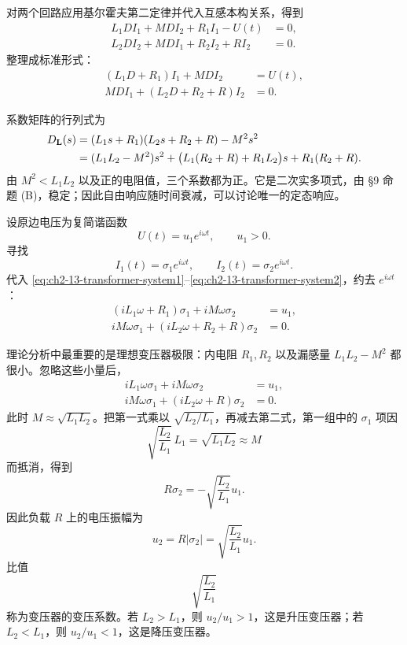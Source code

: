 对两个回路应用基尔霍夫第二定律并代入互感本构关系，得到
\begin{align}
 L_1DI_1+MDI_2+R_1I_1-U(t)&=0,
 \label{eq:ch2-13-transformer-loop1}\\
 L_2DI_2+MDI_1+R_2I_2+RI_2&=0.
 \label{eq:ch2-13-transformer-loop2}
\end{align}
整理成标准形式：
\begin{align}
 (L_1D+R_1)I_1+MDI_2&=U(t),
 \label{eq:ch2-13-transformer-system1}\\
 MDI_1+(L_2D+R_2+R)I_2&=0.
 \label{eq:ch2-13-transformer-system2}
\end{align}

系数矩阵的行列式为
\begin{align}
 D_{\mathbf{L}}(s)
 &=(L_1s+R_1)(L_2s+R_2+R)-M^2s^2\notag\\
 &=(L_1L_2-M^2)s^2
   +\bigl(L_1(R_2+R)+R_1L_2\bigr)s
   +R_1(R_2+R).
 \label{eq:ch2-13-transformer-determinant}
\end{align}
由 \(M^2<L_1L_2\) 以及正的电阻值，三个系数都为正。它是二次实多项式，由 §9 命题 (B)，稳定；因此自由响应随时间衰减，可以讨论唯一的定态响应。

设原边电压为复简谐函数
\begin{equation}
 U(t)=u_1e^{i\omega t},
 \qquad u_1>0.
 \label{eq:ch2-13-transformer-harmonic-source}
\end{equation}
寻找
\begin{equation}
 I_1(t)=\sigma_1e^{i\omega t},
 \qquad
 I_2(t)=\sigma_2e^{i\omega t}.
 \label{eq:ch2-13-transformer-complex-currents}
\end{equation}
代入 \eqref{eq:ch2-13-transformer-system1}--\eqref{eq:ch2-13-transformer-system2}，约去 \(e^{i\omega t}\)：
\begin{align}
 (iL_1\omega+R_1)\sigma_1+iM\omega\sigma_2&=u_1,
 \label{eq:ch2-13-transformer-phasors1}\\
 iM\omega\sigma_1+(iL_2\omega+R_2+R)\sigma_2&=0.
 \label{eq:ch2-13-transformer-phasors2}
\end{align}

理论分析中最重要的是理想变压器极限：内电阻 \(R_1,R_2\) 以及漏感量 \(L_1L_2-M^2\) 都很小。忽略这些小量后，
\begin{align}
 iL_1\omega\sigma_1+iM\omega\sigma_2&=u_1,
 \label{eq:ch2-13-ideal-transformer1}\\
 iM\omega\sigma_1+(iL_2\omega+R)\sigma_2&=0.
 \label{eq:ch2-13-ideal-transformer2}
\end{align}
此时 \(M\approx\sqrt{L_1L_2}\)。把第一式乘以 \(\sqrt{L_2/L_1}\)，再减去第二式，第一组中的 \(\sigma_1\) 项因
\[
 \sqrt{\frac{L_2}{L_1}}\,L_1=\sqrt{L_1L_2}\approx M
\]
而抵消，得到
\begin{equation}
 R\sigma_2=-\sqrt{\frac{L_2}{L_1}}u_1.
 \label{eq:ch2-13-transformer-load-current}
\end{equation}
因此负载 \(R\) 上的电压振幅为
\begin{equation}
 u_2=R|\sigma_2|
 =\sqrt{\frac{L_2}{L_1}}u_1.
 \label{eq:ch2-13-transformer-voltage-ratio}
\end{equation}
比值
\[
 \sqrt{\frac{L_2}{L_1}}
\]
称为变压器的变压系数。若 \(L_2>L_1\)，则 \(u_2/u_1>1\)，这是升压变压器；若 \(L_2<L_1\)，则 \(u_2/u_1<1\)，这是降压变压器。

